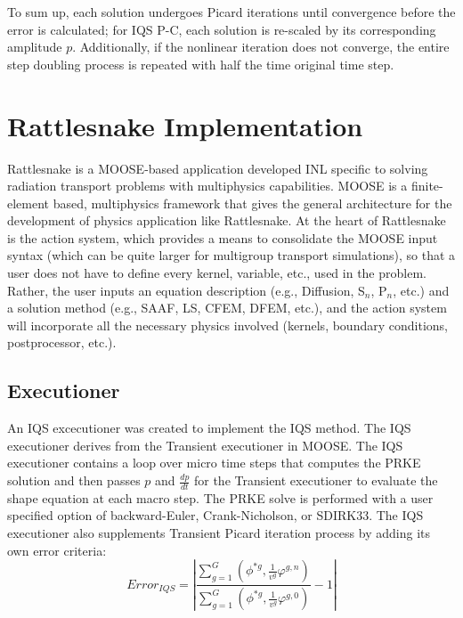 \documentclass[12pt]{scrartcl}
\newcommand{\rattlesnake}{Rattlesnake }
\newcommand{\be}{\begin{equation}}
\newcommand{\ee}{\end{equation}}
\begin{document}
To sum up, each solution undergoes Picard iterations until convergence before the error is calculated; for IQS P-C, each solution is re-scaled by its corresponding amplitude $p$.  Additionally, if the nonlinear iteration does not converge, the entire step doubling process is repeated with half the time original time step. 

\section{\rattlesnake Implementation}

\rattlesnake is a MOOSE-based application developed INL specific to solving radiation transport problems with multiphysics capabilities.  MOOSE is a finite-element based, multiphysics framework that gives the general architecture for the development of physics application like Rattlesnake.   At the heart of \rattlesnake is the action system, which provides a means to consolidate the MOOSE input syntax (which can be quite larger for multigroup transport simulations), so that a user does not have to define every kernel, variable, etc., used in the problem. Rather, the user inputs an equation description 
(e.g., Diffusion, S$_n$, P$_n$, etc.) and a solution method (e.g., SAAF, LS, CFEM, DFEM, etc.), and the action system will incorporate all the necessary physics involved (kernels, boundary conditions, postprocessor, etc.).

 
\subsection{Executioner}

An IQS excecutioner was created to implement the IQS method. The IQS executioner derives from the Transient executioner in MOOSE.  The IQS executioner contains a loop over micro time steps that computes the PRKE solution and then passes $p$ and $\frac{dp}{dt}$ for the Transient executioner to evaluate the shape equation at each macro step.  The PRKE solve is performed with a user specified option of backward-Euler, Crank-Nicholson, or SDIRK33.   The IQS executioner also supplements Transient Picard iteration process by adding its own error criteria:
\be
Error_{IQS}=\left|\frac{\sum_{g=1}^G\left(\phi^{*g},\frac{1}{v^g}\varphi^{g,n}\right)}{\sum_{g=1}^G\left(\phi^{*g},\frac{1}{v^g}\varphi^{g,0}\right)}-1\right|
\label{eq:eiqs}
\ee
\end{document}
